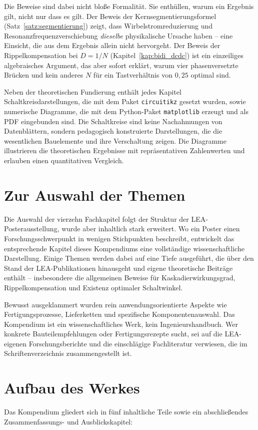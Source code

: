 ﻿\documentclass[a4paper,12pt,openany,oneside]{book}
\newcommand{\abschnitt}[1]{\section{#1}}
\theoremstyle{definition}
\begin{document}
Die Beweise sind dabei nicht blo\ss{}e Formalit\"at. Sie enth\"ullen, warum ein Ergebnis
gilt, nicht nur dass es gilt. Der Beweis der Kernsegmentierungsformel
(Satz~\ref{satz:segmentierung}) zeigt, dass Wirbelstromreduzierung und
Resonanzfrequenzverschiebung \emph{dieselbe} physikalische Ursache haben -- eine
Einsicht, die aus dem Ergebnis allein nicht hervorgeht. Der Beweis der
Rippelkompensation bei $D = 1/N$ (Kapitel~\ref{kap:bidi_dcdc}) ist ein einzeiliges
algebraisches Argument, das aber sofort erkl\"art, warum vier phasenversetzte Br\"ucken
und kein anderes $N$ f\"ur ein Tastverhältnis von $0{,}25$ optimal sind.

Neben der theoretischen Fundierung enth\"alt jedes Kapitel Schaltkreisdarstellungen,
die mit dem Paket \texttt{circuitikz} gesetzt wurden, sowie numerische Diagramme,
die mit dem Python-Paket \texttt{matplotlib} erzeugt und als PDF eingebunden sind.
Die Schaltkreise sind keine Nachahmungen von Datenbl\"attern, sondern pedagogisch
konstruierte Darstellungen, die die wesentlichen Bauelemente und ihre Verschaltung
zeigen. Die Diagramme illustrieren die theoretischen Ergebnisse mit repr\"asentativen
Zahlenwerten und erlauben einen quantitativen Vergleich.

\abschnitt{Zur Auswahl der Themen}

Die Auswahl der vierzehn Fachkapitel folgt der Struktur der LEA-Posterausstellung,
wurde aber inhaltlich stark erweitert. Wo ein Poster einen Forschungsschwerpunkt in
wenigen Stichpunkten beschreibt, entwickelt das entsprechende Kapitel dieses
Kompendiums eine vollst\"andige wissenschaftliche Darstellung. Einige Themen werden
dabei auf eine Tiefe ausgef\"uhrt, die \"uber den Stand der LEA-Publikationen hinausgeht
und eigene theoretische Beitr\"age enth\"alt -- insbesondere die allgemeinen Beweise
f\"ur Kaskadierwirkungsgrad, Rippelkompensation und Existenz optimaler Schaltwinkel.

Bewusst ausgeklammert wurden rein anwendungsorientierte Aspekte wie Fertigungsprozesse,
Lieferketten und spezifische Komponentenauswahl. Das Kompendium ist ein wissenschaftliches
Werk, kein Ingenieurshandbuch. Wer konkrete Bauteilempfehlungen oder Fertigungsrezepte
sucht, sei auf die LEA-eigenen Forschungsberichte und die einschl\"agige Fachliteratur
verwiesen, die im Schriftenverzeichnis zusammengestellt ist.

\abschnitt{Aufbau des Werkes}

Das Kompendium gliedert sich in f\"unf inhaltliche Teile sowie ein abschlie\ss{}endes
Zusammenfassungs- und Ausblickskapitel:
\end{document}

